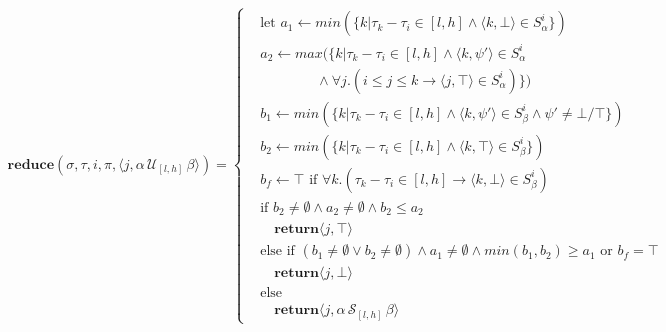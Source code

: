 \documentclass[10pt,a4paper]{article}
\newcommand{\rp}[2]{\ensuremath{\langle #1, #2 \rangle}}
\begin{document}
\begin{align*}
\mathbf{reduce}(\sigma,\tau, i,\pi,\rp{j}{\alpha\, \mathcal{U}_{[l,h]}\, \beta}) = \left\{
\begin{aligned}
&\text{let } a_1 \leftarrow min(\{k | \tau_k - \tau_i \in [l, h] \wedge \rp{k}{\bot} \in S^i_{\alpha} \}) \\
&a_2 \leftarrow max(\{k | \tau_k - \tau_i \in [l, h] \wedge  \rp{k}{\psi'} \in S^i_{\alpha} \\  
	& \quad \quad \quad \quad \wedge \forall j. (i \leq j \leq k \rightarrow \rp{j}{\top} \in S^i_{\alpha}) \}) \\
&b_1 \leftarrow min(\{k | \tau_k - \tau_i \in [l, h] \wedge \rp{k}{\psi'} \in S^i_{\beta} \wedge \psi' \neq \bot/\top \}) \\
&b_2 \leftarrow min(\{k | \tau_k - \tau_i \in [l, h] \wedge \rp{k}{\top} \in S^i_{\beta} \}) \\
&b_f \leftarrow \top \text{ if } \forall k.(\tau_k - \tau_i \in [l,h] \rightarrow \rp{k}{\bot} \in S^i_{\beta}) \\
&\text{if }b_2 \neq \emptyset \wedge a_2 \neq \emptyset \wedge b_2 \leq a_2 \\
& \quad\mathbf{return} \rp{j}{\top} \\
&\text{else if } (b_1 \neq \emptyset \vee b_2 \neq \emptyset) \wedge a_1 \neq \emptyset \wedge min(b_1,b_2) \geq a_1 \text{ or } b_f = \top\\
& \quad\mathbf{return} \rp{j}{\bot} \\
&\text{else} \\
& \quad\mathbf{return} \rp{j}{\alpha\, \mathcal{S}_{[l,h]}\, \beta}
\end{aligned} \right. \\
\end{align*}
\end{document}
